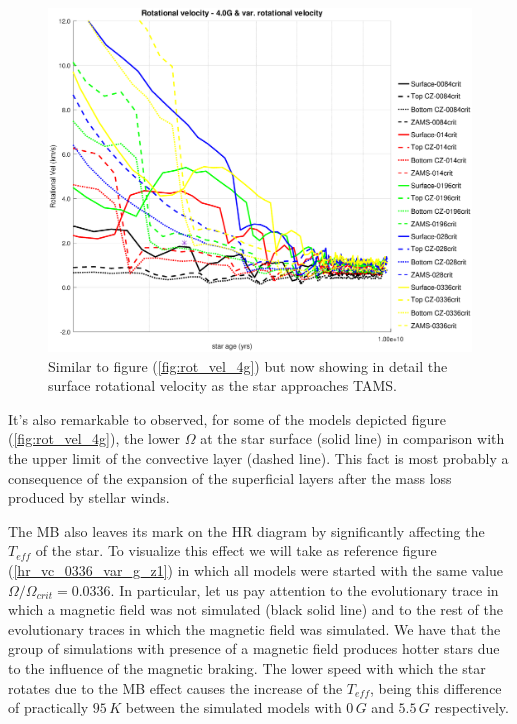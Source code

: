 \documentclass[fleqn,usenatbib]{mnras}
\begin{document}
\begin{figure}
	\includegraphics[trim = 30mm 15mm 20mm 15mm, clip,width=\columnwidth]{figures/rot_vel_var_vel_4_0g_z1.eps}
    \caption{Similar to figure (\ref{fig:rot_vel_4g}) but now showing in detail the surface rotational velocity as the star approaches TAMS.}
    \label{fig:rot_vel_4g_z1}
\end{figure}

It's also remarkable to observed, for some of the models depicted figure (\ref{fig:rot_vel_4g}), the lower $\Omega$ at the star surface (solid line) in comparison with the upper limit of the convective layer (dashed line). This fact is most probably a consequence of the expansion of the superficial layers after the mass loss produced by stellar winds.\par

The MB also leaves its mark on the HR diagram by significantly affecting the $T_{eff}$ of the star. To visualize this effect we will take as reference figure (\ref{hr_vc_0336_var_g_z1}) in which all models were started with the same value $\Omega / \Omega_{crit}=0.0336$. In particular, let us pay attention to the evolutionary trace in which a magnetic field was not simulated (black solid line) and to the rest of the evolutionary traces in which the magnetic field was simulated. We have that the group of simulations with presence of a magnetic field produces hotter stars due to the influence of the magnetic braking. The lower speed with which the star rotates due to the MB effect causes the increase of the $T_{eff}$, being this difference of practically $95\,K$ between the simulated models with $0\,G$ and $5.5\,G$ respectively.
\end{document}
